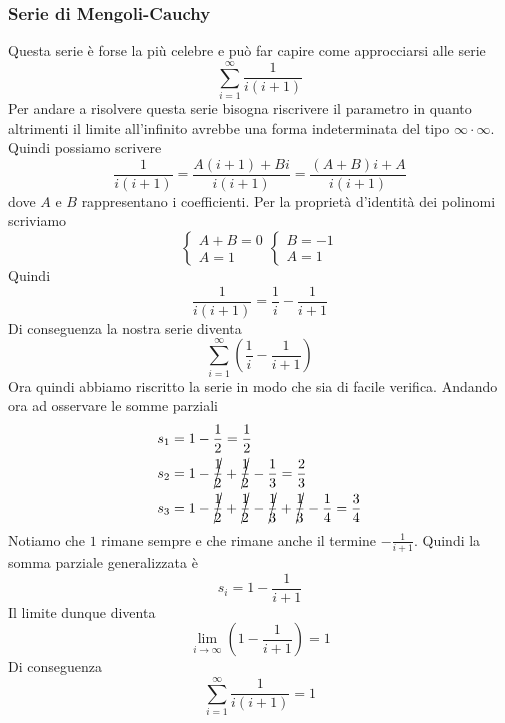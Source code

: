 \subsubsection{Serie di Mengoli-Cauchy}
Questa serie è forse la più celebre e può far capire come approcciarsi alle serie
\begin{equation*}
  \sum\limits^{\infty}_{i=1} \frac{1}{i(i+1)}
\end{equation*}
Per andare a risolvere questa serie bisogna riscrivere il parametro in quanto altrimenti
il limite all'infinito avrebbe una forma indeterminata del tipo $\infty\cdot\infty$. Quindi 
possiamo scrivere
\begin{equation*}
  \frac{1}{i(i+1)} = \frac{A(i+1)+Bi}{i(i+1)} = \frac{(A+B)i+A}{i(i+1)}
\end{equation*}
dove $A$ e $B$ rappresentano i coefficienti. Per la proprietà d'identità dei polinomi scriviamo
\begin{equation*}
  \begin{cases}
    A+B=0\\A=1
  \end{cases}
  \begin{cases}
    B=-1\\A=1
  \end{cases}
\end{equation*}
Quindi
\begin{equation*}
  \frac{1}{i(i+1)} = \frac{1}{i}-\frac{1}{i+1}
\end{equation*}
Di conseguenza la nostra serie diventa
\begin{equation*}
  \sum\limits^{\infty}_{i=1} \left( \frac{1}{i}-\frac{1}{i+1} \right)
\end{equation*}
Ora quindi abbiamo riscritto la serie in modo che sia di facile verifica. Andando ora ad osservare
le somme parziali
\begin{align*}
  \label{eq:}
  s_1 &= 1-\frac{1}{2}=\frac{1}{2}\\
  s_2 &= 1-\cancel{\frac{1}{2}}+\cancel{\frac{1}{2}}-\frac{1}{3}=\frac{2}{3}\\
  s_3 &= 1-\cancel{\frac{1}{2}}+\cancel{\frac{1}{2}}-\cancel{\frac{1}{3}}+\cancel{\frac{1}{3}}
  -\frac{1}{4}=\frac{3}{4}
\end{align*}
Notiamo che $1$ rimane sempre e che rimane anche il termine $-\frac{1}{i+1}$. Quindi la
somma parziale generalizzata è
\begin{equation*}
  s_i=1-\frac{1}{i+1}
\end{equation*}
Il limite dunque diventa
\begin{equation*}
  \lim\limits_{i\to\infty}  \left(1-\frac{1}{i+1} \right) = 1
\end{equation*}
Di conseguenza
\begin{equation*}
  \sum\limits^{\infty}_{i=1} \frac{1}{i(i+1)} = 1
\end{equation*}

